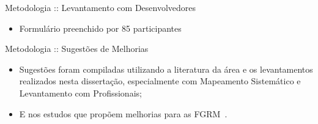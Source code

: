 \documentclass[t,14pt,mathserif]{beamer}
\begin{document}
\begin{frame}{Metodologia :: Levantamento com Desenvolvedores}

    \begin{itemize}
        \item Formulário preenchido por 85 participantes
    \end{itemize}

    \begin{table}[htpb]
    \centering
    \caption{Função desempenhada pelos participantes}
\label{tab:grafico_melhorias_fgrm_funcao_particantes}
    \end{table}

\end{frame}

\begin{frame}{Metodologia :: Sugestões de Melhorias}

    \begin{itemize}
        \item Sugestões foram compiladas utilizando a literatura da área e os
            levantamentos realizados nesta dissertação, especialmente com
            Mapeamento Sistemático e Levantamento com Profissionais;
        \item E nos estudos que propõem melhorias para as
            FGRM~\cite{zimmermann2009improving, bettenburg2008makes,
                singh2011bug}.
    \end{itemize}

\end{frame}
\end{document}
